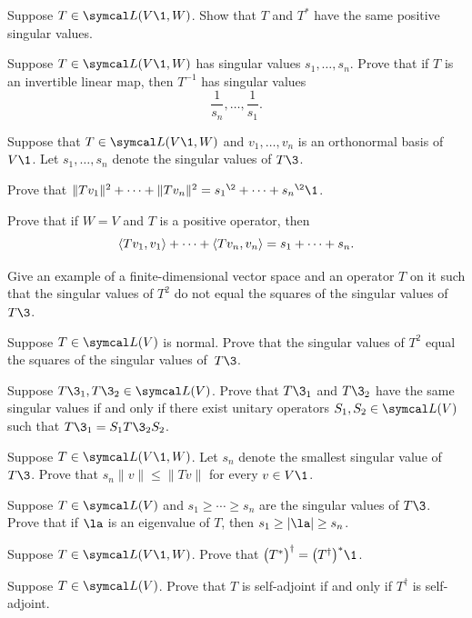 \begin{exercises}
\exercise
Suppose $T \in \L(V\1, W)$. Show that $T$ and $T^*$ have the same positive singular values. \label{4TstarSing}


\exercise
Suppose $T \in \L(V\1, W)$ has singular values $s_1, \ldots, s_n$. Prove that if $T$ is an  invertible linear map, then $T^{-1}$ has singular values\label{7singinv}
\[
\frac{1}{s_n}, \ldots, \frac{1}{s_1}.
\]
\exercisedisplayend


\exercise
Suppose that $T \in \L(V\1, W)$ and $v_1, \ldots, v_n$ is an orthonormal basis of $V\1$. Let $s_1, \ldots, s_n$ denote the singular values of $T\3$.\label{7sums2}
\begin{subtheorem}
\item
Prove that
$\norm{Tv_1}^2 + \cdots + \norm{Tv_n}^2 = {s_1}^{\2} + \cdots + {s_n}^{\2}\1$.
\item
Prove that if $W = V$ and $T$ is a positive operator, then
\[
\langle Tv_1, v_1\rangle + \cdots + \langle Tv_n, v_n\rangle = s_1 + \cdots + s_n.
\]
\exercisedisplayend
\end{subtheorem}


\exercise
\begin{SUBtheorem}
\item
Give an example of a finite-dimensional vector space and an operator $T$ on it
such that the singular values of $T^2$ do not equal the squares of the singular values of~$T\3$.
\item
Suppose $T \in \L(V)$ is normal. Prove that the singular values of $T^2$ equal the squares of the singular values of~$T\3$.
\end{SUBtheorem}


\exercise
Suppose $T\3_1, T\3_2 \in \L(V)$.  Prove that $T\3_1$ and $T\3_2$ have the
same singular values if and only if there exist unitary operators $S_1, S_2
\in \L(V)$ such that $T\3_1 = S_1 T\3_2 S_2$.


\exercise
Suppose $T \in \L(V\1,W)$.  Let $s_n$ denote the smallest singular value of~$T\3$.
Prove that $s_n \| v \| \le \| Tv \|$ for every $v \in V\1$. \label{3smallSV}


\exercise
Suppose $T \in \L(V)$ and $s_1 \ge \cdots \ge s_n$ are the singular values of $T\3$.
Prove that if $\la$ is an eigenvalue of $T$, then $s_1  \ge |\la| \ge s_n$.


\exercise
Suppose $T \in \L(V\1, W)$. Prove that $\paren[\big]{T^*}^\dagger = \paren[\big]{T^\dagger}^*\1$.\label{7Tdagstar}


\exercise
Suppose $T \in \L(V)$. Prove that $T$ is self-adjoint if and only if $T^\dagger$ is self-adjoint.


\end{exercises}

